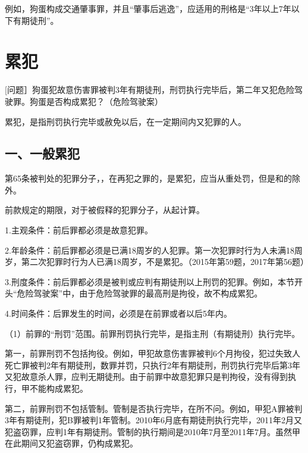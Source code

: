 例如，狗蛋构成交通肇事罪，并且“肇事后逃逸”，应适用的刑格是“3年以上7年以下有期徒刑”。


\section{累犯}

[问题］狗蛋犯故意伤害罪被判3年有期徒刑，刑罚执行完毕后，第二年又犯危险驾驶罪。狗蛋是否构成累犯？（危险驾驶案）

累犯，是指刑罚执行完毕或赦免以后，在一定期间内又犯罪的人。

\subsection*{一、一般累犯}

第65条被判处的犯罪分子，，在再犯之罪的，是累犯，应当从重处罚，但是和的除外。

前款规定的期限，对于被假释的犯罪分子，从起计算。

1.主观条件：前后罪都必须是故意犯罪。

2.年龄条件：前后罪都必须是已满18周岁的人犯罪。第一次犯罪时行为人未满18周岁，第二次犯罪时行为人已满18周岁，不是累犯。（2015年第59题，2017年第56题）

3.刑度条件：前后罪都必须是被判或应判有期徒刑以上刑罚的犯罪。例如，本节开头“危险驾驶案”中，由于危险驾驶罪的最高刑是拘役，故不构成累犯。

4.时间条件：后罪发生的时间，必须是在前罪或者以后5年内。

（1）前罪的“刑罚”范围。前罪刑罚执行完毕，是指主刑（有期徒刑）执行完毕。

第一，前罪刑罚不包括拘役。例如，甲犯故意伤害罪被判6个月拘役，犯过失致人死亡罪被判2年有期徒刑，数罪并罚，只执行2年有期徒刑，刑罚执行完毕后第3年又犯故意杀人罪，应判无期徒刑。由于前罪中故意犯罪只是判拘役，没有得到执行，甲不能构成累犯。

第二，前罪刑罚不包括管制。管制是否执行完毕，在所不问。例如，甲犯A罪被判3年有期徒刑，犯B罪被判1年管制。2010年6月底有期徒刑执行完毕，2011年2月又犯盗窃罪，应判1年有期徒刑。管制的执行期间是2010年7月至2011年7月。虽然甲在此期间又犯盗窃罪，仍构成累犯。

